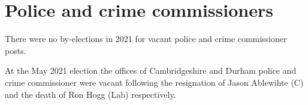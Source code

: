 \documentclass[a4paper,openany]{book}
\begin{document}
\section{Police and crime commissioners}

There were no by-elections in 2021 for vacant police and crime commissioner posts.

At the May 2021 election the offices of Cambridgeshire and Durham police and crime commissioner were vacant following the resignation of Jason Ablewihte (C) and the death of Ron Hogg (Lab) respectively.

%
%
%
%
%

%
\end{document}
